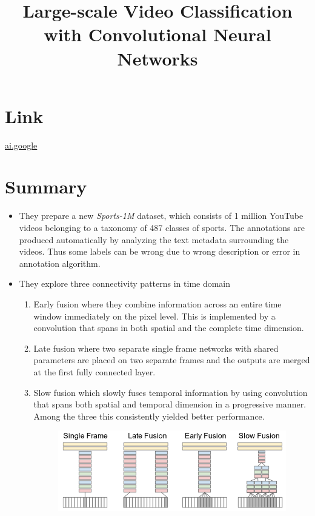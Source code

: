 \documentclass{article}
\title{Large-scale Video Classification with Convolutional Neural Networks}
\author{}
\date{}
\begin{document}
\maketitle

\section*{Link}
\href{https://research.google.com/pubs/archive/42455.pdf}{ai.google} 

\section*{Summary}
\begin{itemize}
    \item They prepare a new \textit{Sports-1M} dataset, which consists of 1 million YouTube videos belonging to a taxonomy of 487 classes of sports. The annotations are produced automatically by analyzing the text metadata surrounding the videos. Thus some labels can be wrong due to wrong description or error in annotation algorithm.
    \item They explore three connectivity patterns in time domain
    \begin{enumerate}
        \item Early fusion where they combine information across an entire time window immediately on the pixel level. This is implemented by a convolution that spans in both spatial and the complete time dimension.
        \item Late fusion where two separate single frame networks with shared parameters are placed on two separate frames and the outputs are merged at the first fully connected layer.
        \item Slow fusion which slowly fuses temporal information by using convolution that spans both spatial and temporal dimension in a progressive manner. Among the three this consistently yielded better performance.
        \begin{figure}[H]
            \centering
            \includegraphics[scale=0.7]{fusions.PNG}

\end{figure}
\end{enumerate}
\end{itemize}
\end{document}
